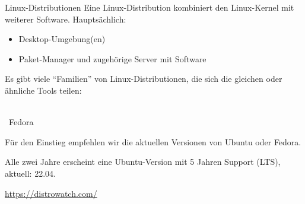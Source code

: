 \begin{frame}{Linux-Distributionen}
    Eine Linux-Distribution kombiniert den Linux-Kernel mit weiterer Software. Hauptsächlich:
    \begin{itemize}
        \item Desktop-Umgebung(en)
        \item Paket-Manager und zugehörige Server mit Software
    \end{itemize}

    Es gibt viele \enquote{Familien} von Linux-Distributionen, die sich die gleichen oder ähnliche Tools teilen:
    \begin{center}
        \hspace{0.5cm} \\[1\baselineskip]

        ~{\Huge Fedora}
        \hspace{0.5cm}
    \end{center}

    Für den Einstieg empfehlen wir die aktuellen Versionen von Ubuntu oder Fedora.

    Alle zwei Jahre erscheint eine Ubuntu-Version mit 5 Jahren Support (LTS), aktuell: 22.04.

    \url{https://distrowatch.com/} 
\end{frame}
